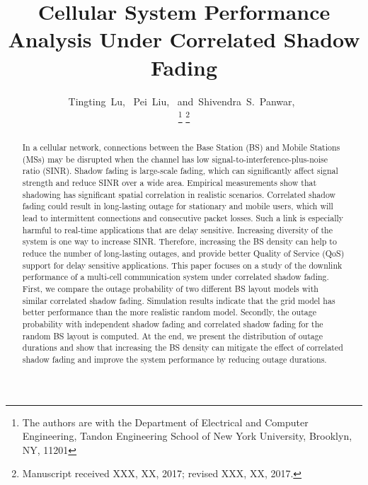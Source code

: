 \documentclass[journal,10pt]{IEEEtran}
\begin{document}

\title{Cellular System Performance Analysis Under Correlated Shadow Fading}


\author{Tingting~Lu,~
        Pei~Liu,~
        and~Shivendra~S.~Panwar,~%

\thanks{The authors are with the Department of Electrical and Computer Engineering, Tandon Engineering School of New York University, Brooklyn, NY, 11201}%
\thanks{Manuscript received XXX, XX, 2017; revised XXX, XX, 2017.}}

{}







\maketitle
\begin{abstract}
In a cellular network, connections between the Base Station (BS) and Mobile Stations (MSs) may be disrupted when the channel has low signal-to-interference-plus-noise ratio (SINR). Shadow fading is large-scale fading, which can significantly affect signal strength and reduce SINR over a wide area. Empirical measurements show that shadowing has significant spatial correlation in realistic scenarios. Correlated shadow fading could result in long-lasting outage for stationary and mobile users, which will lead to intermittent connections and consecutive packet losses. Such a link is especially harmful to real-time applications that are delay sensitive. Increasing diversity of the system is one way to increase SINR. Therefore, increasing the BS density can help to reduce the number of long-lasting outages, and provide better Quality of Service (QoS) support for delay sensitive applications. This paper focuses on a study of the downlink performance of a multi-cell communication system under correlated shadow fading. First, we compare the outage probability of two different BS layout models with similar correlated shadow fading. Simulation results indicate that the grid model has better performance than the more realistic random model. Secondly, the outage probability with independent shadow fading and correlated shadow fading for the random BS layout is computed. At the end, we present the distribution of outage durations and show that increasing the BS density can mitigate the effect of correlated shadow fading and improve the system performance by reducing outage durations. 

\end{abstract}
\end{document}
